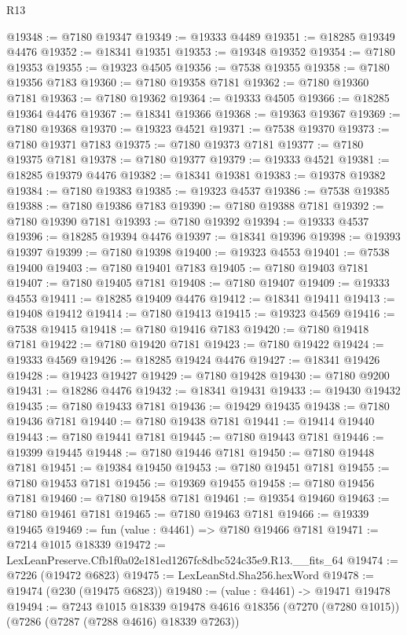 \begin{lexlean}{R13}
\begin{coremodule}
@19348 := @7180 @19347
@19349 := @19333 @4489
@19351 := @18285 @19349 @4476
@19352 := @18341 @19351
@19353 := @19348 @19352
@19354 := @7180 @19353
@19355 := @19323 @4505
@19356 := @7538 @19355
@19358 := @7180 @19356 @7183
@19360 := @7180 @19358 @7181
@19362 := @7180 @19360 @7181
@19363 := @7180 @19362
@19364 := @19333 @4505
@19366 := @18285 @19364 @4476
@19367 := @18341 @19366
@19368 := @19363 @19367
@19369 := @7180 @19368
@19370 := @19323 @4521
@19371 := @7538 @19370
@19373 := @7180 @19371 @7183
@19375 := @7180 @19373 @7181
@19377 := @7180 @19375 @7181
@19378 := @7180 @19377
@19379 := @19333 @4521
@19381 := @18285 @19379 @4476
@19382 := @18341 @19381
@19383 := @19378 @19382
@19384 := @7180 @19383
@19385 := @19323 @4537
@19386 := @7538 @19385
@19388 := @7180 @19386 @7183
@19390 := @7180 @19388 @7181
@19392 := @7180 @19390 @7181
@19393 := @7180 @19392
@19394 := @19333 @4537
@19396 := @18285 @19394 @4476
@19397 := @18341 @19396
@19398 := @19393 @19397
@19399 := @7180 @19398
@19400 := @19323 @4553
@19401 := @7538 @19400
@19403 := @7180 @19401 @7183
@19405 := @7180 @19403 @7181
@19407 := @7180 @19405 @7181
@19408 := @7180 @19407
@19409 := @19333 @4553
@19411 := @18285 @19409 @4476
@19412 := @18341 @19411
@19413 := @19408 @19412
@19414 := @7180 @19413
@19415 := @19323 @4569
@19416 := @7538 @19415
@19418 := @7180 @19416 @7183
@19420 := @7180 @19418 @7181
@19422 := @7180 @19420 @7181
@19423 := @7180 @19422
@19424 := @19333 @4569
@19426 := @18285 @19424 @4476
@19427 := @18341 @19426
@19428 := @19423 @19427
@19429 := @7180 @19428
@19430 := @7180 @9200
@19431 := @18286 @4476
@19432 := @18341 @19431
@19433 := @19430 @19432
@19435 := @7180 @19433 @7181
@19436 := @19429 @19435
@19438 := @7180 @19436 @7181
@19440 := @7180 @19438 @7181
@19441 := @19414 @19440
@19443 := @7180 @19441 @7181
@19445 := @7180 @19443 @7181
@19446 := @19399 @19445
@19448 := @7180 @19446 @7181
@19450 := @7180 @19448 @7181
@19451 := @19384 @19450
@19453 := @7180 @19451 @7181
@19455 := @7180 @19453 @7181
@19456 := @19369 @19455
@19458 := @7180 @19456 @7181
@19460 := @7180 @19458 @7181
@19461 := @19354 @19460
@19463 := @7180 @19461 @7181
@19465 := @7180 @19463 @7181
@19466 := @19339 @19465
@19469 := fun (value : @4461) => @7180 @19466 @7181
@19471 := @7214 @1015 @18339
@19472 := LexLeanPreserve.Cfb1f0a02e181ed1267fc8dbc524c35e9.R13.__fits_64
@19474 := @7226 (@19472 @6823)
@19475 := LexLeanStd.Sha256.hexWord
@19478 := @19474 (@230 (@19475 @6823))
@19480 := (value : @4461) -> @19471 @19478
@19494 := @7243
    @1015
    @18339
    @19478
    @4616
    @18356
    (@7270 (@7280 @1015))
    (@7286 (@7287 (@7288 @4616) @18339 @7263))

\end{coremodule}
\end{lexlean}
